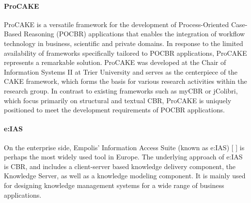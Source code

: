         
            \paragraph{ProCAKE}
            ProCAKE is a versatile framework for the development of Process-Oriented Case-Based Reasoning (POCBR) applications that enables the integration of workflow technology in business, scientific and private domains. In response to the limited availability of frameworks specifically tailored to POCBR applications, ProCAKE represents a remarkable solution. ProCAKE was developed at the Chair of Information Systems II at Trier University and serves as the centerpiece of the CAKE framework, which forms the basis for various research activities within the research group. In contrast to existing frameworks such as myCBR or jColibri, which focus primarily on structural and textual CBR, ProCAKE is uniquely positioned to meet the development requirements of POCBR applications.


            \paragraph{e:IAS}
            On the enterprise side, Empolis' Information Access Suite (known as e:IAS) [ ] is perhaps the most widely used tool in Europe. The underlying approach of e:IAS is CBR, and includes a client-server based knowledge delivery component, the Knowledge Server, as well as a knowledge modeling component. It is mainly used for designing knowledge management systems for a wide range of business applications.
